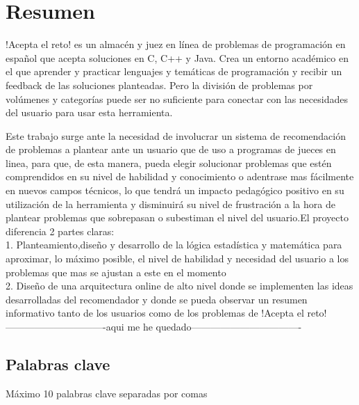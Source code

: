\chapter*{Resumen}

!Acepta el reto! es un almacén y juez en línea de problemas de programación en español que acepta soluciones en C, C++ y Java. Crea un entorno académico en el que aprender y practicar lenguajes y temáticas de programación y recibir un feedback de las soluciones planteadas. Pero la división de problemas por volúmenes y categorías puede ser no suficiente para conectar con las necesidades del usuario para usar esta herramienta.
 
Este trabajo surge ante la necesidad de involucrar un sistema de recomendación de problemas a plantear ante un usuario que de uso a programas de jueces en linea, para que, de esta manera,   pueda elegir solucionar problemas que estén comprendidos en su nivel de habilidad y conocimiento o adentrase mas fácilmente en nuevos campos técnicos, lo que tendrá un impacto pedagógico positivo en su utilización de la herramienta y disminuirá su nivel de frustración a la hora de plantear problemas que sobrepasan o subestiman el nivel del usuario.El proyecto diferencia 2 partes claras: \\

	1. Planteamiento,diseño y desarrollo de la lógica estadística y matemática para aproximar, lo máximo posible, el nivel de habilidad y necesidad del usuario a los problemas que mas se ajustan a este en el momento \\
	
	2. Diseño de una arquitectura online de alto nivel donde se implementen las ideas desarrolladas del recomendador y donde se pueda observar un resumen informativo tanto de los usuarios como de los problemas de !Acepta el reto! \\
	
-------------------------------aqui me he quedado---------------------------------- 


\section*{Palabras clave}
   
\noindent Máximo 10 palabras clave separadas por comas

   


